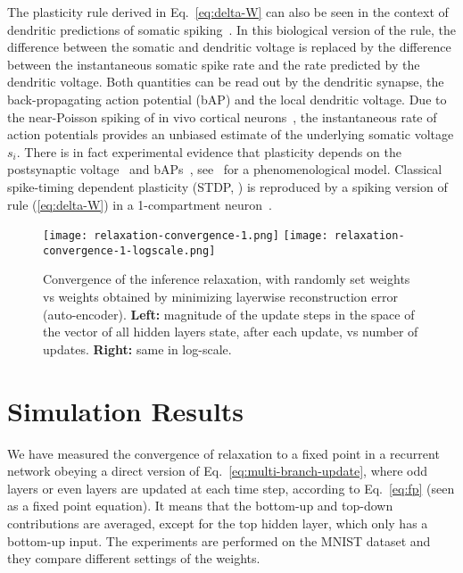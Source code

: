 \documentclass{article}
\begin{document}
The plasticity rule derived in Eq.~\ref{eq:delta-W} can also be seen in the context of dendritic predictions of somatic spiking~\citep{Urbanczik+Senn-2014}. In this biological version of the rule, the difference between the somatic and dendritic voltage is replaced by the difference between the instantaneous somatic spike rate and the rate predicted by the dendritic voltage. Both quantities can be read out by the dendritic synapse, the back-propagating action potential (bAP) and the local dendritic voltage.  Due to the near-Poisson
spiking of in vivo cortical neurons~\citep{Shadlen1998}, the instantaneous rate of action potentials
provides an unbiased estimate of the underlying somatic voltage $s_i$. There is in fact experimental evidence that plasticity depends on the postsynaptic voltage~\citep{Artola1990,Sjostrom2001} and bAPs~\citep{Markram1997}, see~\citep{Clopath2010} for a phenomenological model. Classical spike-timing dependent plasticity (STDP, \citet{Markram1997}) is reproduced by a spiking version of rule (\ref{eq:delta-W}) in a 1-compartment neuron~\citep{Brea2013}.


\begin{figure}[htpb]
  \begin{center}
    \hspace*{-1cm}\texttt{[image: relaxation-convergence-1.png]} \hspace*{-1cm}
    \texttt{[image: relaxation-convergence-1-logscale.png]}
  \end{center}
    \hspace*{-3cm}\begin{minipage}{1.4\textwidth}
  \caption{Convergence of the inference relaxation, with randomly set weights vs weights obtained
    by minimizing layerwise reconstruction error (auto-encoder). {\bf Left:} magnitude of the update steps in the
    space of the vector of all hidden layers state, after each update, vs number of updates. {\bf Right:} same in log-scale.}
  \label{fig:convergence-1}
    \end{minipage}
\end{figure}

\section{Simulation Results}

We have measured the convergence of relaxation to a fixed point in a recurrent network obeying a direct
version of Eq.~\ref{eq:multi-branch-update}, where odd layers or even layers are updated at each time step,
according to Eq.~\ref{eq:fp} (seen as a fixed point equation). It means that the bottom-up and top-down
contributions are averaged, except for the top hidden layer, which only has a bottom-up input.
The experiments are performed on the MNIST dataset and they compare different settings of the
weights.
\end{document}
